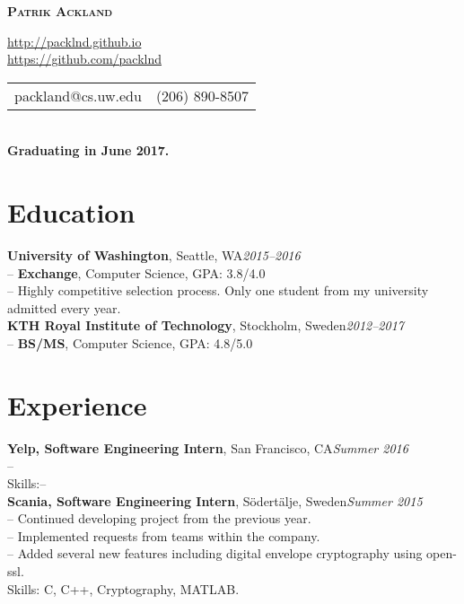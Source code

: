 \documentclass[10pt]{article}
\begin{document}

\centerline{\LARGE \textbf{\textsc{Patrik Ackland}}}

\begin{center}
  \url{http://packlnd.github.io}\\
  \vspace{0.3em}
  \url{https://github.com/packlnd}\\
  \vspace{0.3em}
  \begin{tabular}{l r}
    packland@cs.uw.edu&(206) 890-8507
  \end{tabular} \\
  \vspace{0.3em}
  \textbf{Graduating in June 2017.}
\end{center}

\section*{Education}
\vspace{0.1em}
\hline
\vspace{0.3em}
\noindent\textbf{University of Washington}, Seattle, WA\hfill\textit{2015--2016}\\
\indent-- \textbf{Exchange}, Computer Science, GPA: 3.8/4.0\\
\indent-- Highly competitive selection process. Only one student from my university admitted every year.\\

\noindent\textbf{KTH Royal Institute of Technology}, Stockholm, Sweden\hfill\textit{2012--2017}\\
\indent-- \textbf{BS/MS}, Computer Science, GPA: 4.8/5.0\\

\section*{Experience}
\vspace{0.1em}
\hline
\vspace{0.3em}
\noindent\textbf{Yelp, Software Engineering Intern}, San Francisco, CA\hfill\textit{Summer 2016}\\
\indent-- \\
\indent Skills:--\\

\noindent\textbf{Scania, Software Engineering Intern}, Södertälje, Sweden\hfill\textit{Summer 2015}\\
\indent-- Continued developing project from the previous year.\\
\indent-- Implemented requests from teams within the company.\\
\indent-- Added several new features including digital envelope cryptography using open-ssl.\\
\indent Skills: C, C++, Cryptography, MATLAB. \\
\end{document}
